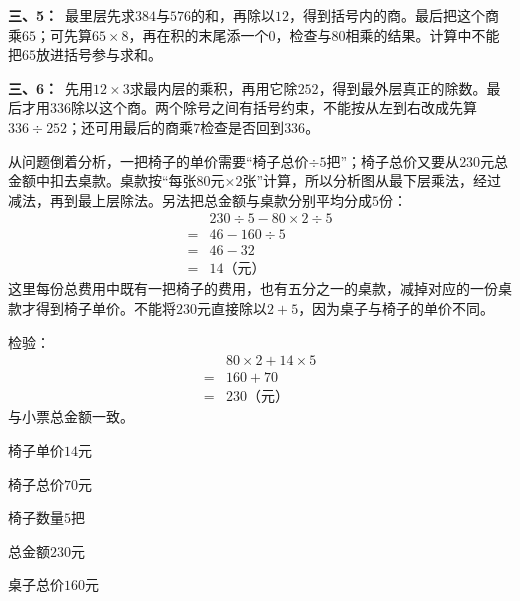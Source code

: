 \documentclass[multi=snippet,border=0pt]{standalone}
\newenvironment{snippet}[3]{\begin{minipage}{#1bp}\color{answerred}\fontsize{#2}{#3}\selectfont\raggedright}{\end{minipage}}
\begin{document}
\begin{snippet}{505}{11.5}{14}\textbf{三、5：}\ 最里层先求\(384\)与\(576\)的和，再除以\(12\)，得到括号内的商。最后把这个商乘\(65\)；可先算\(65\times8\)，再在积的末尾添一个\(0\)，检查与\(80\)相乘的结果。计算中不能把\(65\)放进括号参与求和。\end{snippet}
\begin{snippet}{505}{11.5}{14}\textbf{三、6：}\ 先用\(12\times3\)求最内层的乘积，再用它除\(252\)，得到最外层真正的除数。最后才用\(336\)除以这个商。两个除号之间有括号约束，不能按从左到右改成先算\(336\div252\)；还可用最后的商乘\(7\)检查是否回到\(336\)。\end{snippet}
\begin{snippet}{505}{11.5}{14}从问题倒着分析，一把椅子的单价需要“椅子总价\(\div5\)把”；椅子总价又要从\(230\)元总金额中扣去桌款。桌款按“每张\(80\)元\(\times2\)张”计算，所以分析图从最下层乘法，经过减法，再到最上层除法。另法把总金额与桌款分别平均分成\(5\)份：\[\begin{aligned}&230\div5-80\times2\div5\\={}&46-160\div5\\={}&46-32\\={}&14\text{（元）}\end{aligned}\]这里每份总费用中既有一把椅子的费用，也有五分之一的桌款，减掉对应的一份桌款才得到椅子单价。不能将\(230\)元直接除以\(2+5\)，因为桌子与椅子的单价不同。\par 检验：\[\begin{aligned}&80\times2+14\times5\\={}&160+70\\={}&230\text{（元）}\end{aligned}\]与小票总金额一致。\end{snippet}
\begin{snippet}{72.04999999999995}{8.5}{12.8}椅子单价\(14\)元\end{snippet}
\begin{snippet}{71.79999999999995}{8.5}{12.8}椅子总价\(70\)元\end{snippet}
\begin{snippet}{71.79999999999995}{8.5}{12.8}椅子数量\(5\)把\end{snippet}
\begin{snippet}{72.29999999999995}{8.5}{12.8}总金额\(230\)元\end{snippet}
\begin{snippet}{72.04999999999995}{8.5}{12.8}桌子总价\(160\)元\end{snippet}
\end{document}
